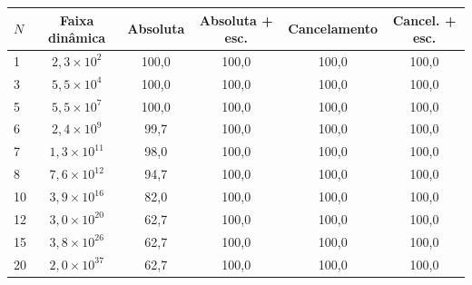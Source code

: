 \begin{tabular}{lccccc}
\hline
$N$ & Faixa dinâmica & Absoluta & Absoluta + esc. & Cancelamento & Cancel. + esc. \\
\hline
1 & $2{,}3 \times 10^{2}$ & 100{,}0 & 100{,}0 & 100{,}0 & 100{,}0 \\
3 & $5{,}5 \times 10^{4}$ & 100{,}0 & 100{,}0 & 100{,}0 & 100{,}0 \\
5 & $5{,}5 \times 10^{7}$ & 100{,}0 & 100{,}0 & 100{,}0 & 100{,}0 \\
6 & $2{,}4 \times 10^{9}$ & 99{,}7 & 100{,}0 & 100{,}0 & 100{,}0 \\
7 & $1{,}3 \times 10^{11}$ & 98{,}0 & 100{,}0 & 100{,}0 & 100{,}0 \\
8 & $7{,}6 \times 10^{12}$ & 94{,}7 & 100{,}0 & 100{,}0 & 100{,}0 \\
10 & $3{,}9 \times 10^{16}$ & 82{,}0 & 100{,}0 & 100{,}0 & 100{,}0 \\
12 & $3{,}0 \times 10^{20}$ & 62{,}7 & 100{,}0 & 100{,}0 & 100{,}0 \\
15 & $3{,}8 \times 10^{26}$ & 62{,}7 & 100{,}0 & 100{,}0 & 100{,}0 \\
20 & $2{,}0 \times 10^{37}$ & 62{,}7 & 100{,}0 & 100{,}0 & 100{,}0 \\
\hline
\end{tabular}
